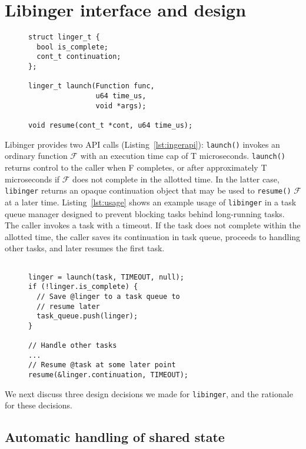 \section{Libinger interface and design}

\begin{figure}
\begin{lstlisting}[label=lst:ingerapi,caption=Preemptible functions interface]
struct linger_t {
  bool is_complete;
  cont_t continuation;
};

linger_t launch(Function func,
                u64 time_us,
                void *args);

void resume(cont_t *cont, u64 time_us);
\end{lstlisting}
\end{figure}

Libinger provides two API calls (Listing~\ref{lst:ingerapi}): \texttt{launch()}
invokes an ordinary function $\mathcal{F}$ with an execution time cap of T
microseconds. \texttt{launch()} returns control to the caller when F completes,
or after approximately T microseconds if $\mathcal{F}$ does not complete in the
allotted time. In the latter case, \texttt{libinger} returns an opaque
continuation object that may be used to \texttt{resume()} $\mathcal{F}$ at a
later time. Listing~\ref{lst:usage} shows an example usage of \texttt{libinger}
in a task queue manager designed to prevent blocking tasks behind long-running
tasks. The caller invokes a task with a timeout. If the task does not complete
within the allotted time, the caller saves its continuation in task queue,
proceeds to handling other tasks, and later resumes the first task. 

\begin{figure}
\begin{lstlisting}[label=lst:usage, caption=Preemptible function usage example]

linger = launch(task, TIMEOUT, null);
if (!linger.is_complete) {
  // Save @linger to a task queue to
  // resume later
  task_queue.push(linger);
}

// Handle other tasks
...
// Resume @task at some later point
resume(&linger.continuation, TIMEOUT);

\end{lstlisting}
\end{figure}

We next discuss three design decisions we made for \texttt{libinger}, and the
rationale for these decisions.

\subsection{Automatic handling of shared state}

